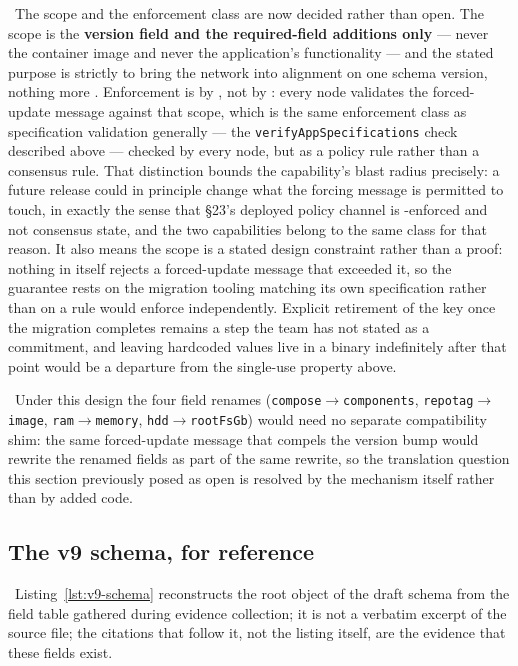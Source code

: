 \planned\ The scope and the enforcement class are now decided rather than open. The scope is the
\textbf{version field and the required-field additions only} --- never the container image and never
the application's functionality --- and the stated purpose is strictly to bring the network into
alignment on one schema version, nothing more
. Enforcement is by \textbf{\FluxOS}, not by
\fluxd: every node validates the forced-update message against that scope, which is the same
enforcement class as specification validation generally --- the \texttt{verify\allowbreak{}App\allowbreak{}Specifications}
check described above --- checked by every node, but as a \FluxOS{} policy rule rather than a
consensus rule. That distinction bounds the capability's blast radius precisely: a future \FluxOS{}
release could in principle change what the forcing message is permitted to touch, in exactly the
sense that \S23's deployed policy channel is \FluxOS-enforced and not consensus state, and the two
capabilities belong to the same class for that reason. It also means the scope is a stated design
constraint rather than a proof: nothing in \fluxd{} itself rejects a forced-update message that
exceeded it, so the guarantee rests on the migration tooling matching its own specification rather
than on a rule \fluxd{} would enforce independently. Explicit retirement of the key once the
migration completes remains a step the team has not stated as a commitment, and leaving hardcoded
values live in a binary indefinitely after that point would be a departure from the single-use
property above.

\planned\ Under this design the four field renames (\texttt{compose}$\to$\texttt{components},
\texttt{repotag}$\to$\texttt{image}, \texttt{ram}$\to$\texttt{memory},
\texttt{hdd}$\to$\texttt{rootFsGb}) would need no separate compatibility shim: the same
forced-update message that compels the version bump would rewrite the renamed fields as part of the
same rewrite, so the translation question this section previously posed as open is resolved by the
mechanism itself rather than by added code.

\subsection{The v9 schema, for reference}

\inprogress\ Listing~\ref{lst:v9-schema} reconstructs the root object of the draft schema from the
field table gathered during evidence collection; it is not a verbatim excerpt of the source file;
the citations that follow it, not the listing itself, are the evidence that these fields exist.

